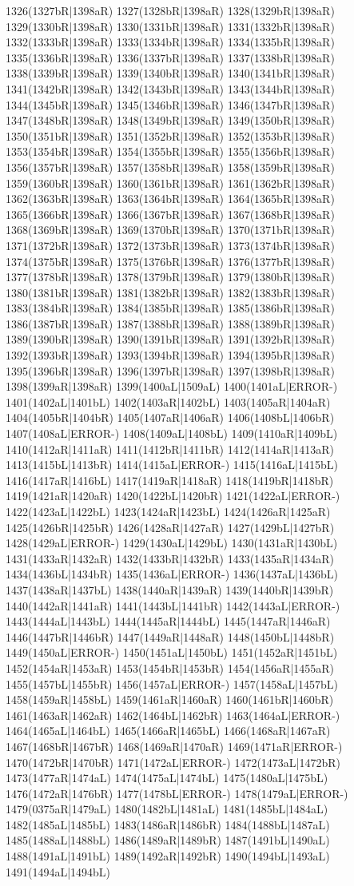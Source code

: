 1326(1327bR|1398aR) 1327(1328bR|1398aR) 1328(1329bR|1398aR) 1329(1330bR|1398aR) 1330(1331bR|1398aR) 1331(1332bR|1398aR) 1332(1333bR|1398aR) 1333(1334bR|1398aR) 1334(1335bR|1398aR) 1335(1336bR|1398aR) 1336(1337bR|1398aR) 1337(1338bR|1398aR) 1338(1339bR|1398aR) 1339(1340bR|1398aR) 1340(1341bR|1398aR) 1341(1342bR|1398aR) 1342(1343bR|1398aR) 1343(1344bR|1398aR) 1344(1345bR|1398aR) 1345(1346bR|1398aR) 1346(1347bR|1398aR) 1347(1348bR|1398aR) 1348(1349bR|1398aR) 1349(1350bR|1398aR) 1350(1351bR|1398aR) 1351(1352bR|1398aR) 1352(1353bR|1398aR) 1353(1354bR|1398aR) 1354(1355bR|1398aR) 1355(1356bR|1398aR) 1356(1357bR|1398aR) 1357(1358bR|1398aR) 1358(1359bR|1398aR) 1359(1360bR|1398aR) 1360(1361bR|1398aR) 1361(1362bR|1398aR) 1362(1363bR|1398aR) 1363(1364bR|1398aR) 1364(1365bR|1398aR) 1365(1366bR|1398aR) 1366(1367bR|1398aR) 1367(1368bR|1398aR) 1368(1369bR|1398aR) 1369(1370bR|1398aR) 1370(1371bR|1398aR) 1371(1372bR|1398aR) 1372(1373bR|1398aR) 1373(1374bR|1398aR) 1374(1375bR|1398aR) 1375(1376bR|1398aR) 1376(1377bR|1398aR) 1377(1378bR|1398aR) 1378(1379bR|1398aR) 1379(1380bR|1398aR) 1380(1381bR|1398aR) 1381(1382bR|1398aR) 1382(1383bR|1398aR) 1383(1384bR|1398aR) 1384(1385bR|1398aR) 1385(1386bR|1398aR) 1386(1387bR|1398aR) 1387(1388bR|1398aR) 1388(1389bR|1398aR) 1389(1390bR|1398aR) 1390(1391bR|1398aR) 1391(1392bR|1398aR) 1392(1393bR|1398aR) 1393(1394bR|1398aR) 1394(1395bR|1398aR) 1395(1396bR|1398aR) 1396(1397bR|1398aR) 1397(1398bR|1398aR) 1398(1399aR|1398aR) 1399(1400aL|1509aL) 1400(1401aL|ERROR-) 1401(1402aL|1401bL) 1402(1403aR|1402bL) 1403(1405aR|1404aR) 1404(1405bR|1404bR) 1405(1407aR|1406aR) 1406(1408bL|1406bR) 1407(1408aL|ERROR-) 1408(1409aL|1408bL) 1409(1410aR|1409bL) 1410(1412aR|1411aR) 1411(1412bR|1411bR) 1412(1414aR|1413aR) 1413(1415bL|1413bR) 1414(1415aL|ERROR-) 1415(1416aL|1415bL) 1416(1417aR|1416bL) 1417(1419aR|1418aR) 1418(1419bR|1418bR) 1419(1421aR|1420aR) 1420(1422bL|1420bR) 1421(1422aL|ERROR-) 1422(1423aL|1422bL) 1423(1424aR|1423bL) 1424(1426aR|1425aR) 1425(1426bR|1425bR) 1426(1428aR|1427aR) 1427(1429bL|1427bR) 1428(1429aL|ERROR-) 1429(1430aL|1429bL) 1430(1431aR|1430bL) 1431(1433aR|1432aR) 1432(1433bR|1432bR) 1433(1435aR|1434aR) 1434(1436bL|1434bR) 1435(1436aL|ERROR-) 1436(1437aL|1436bL) 1437(1438aR|1437bL) 1438(1440aR|1439aR) 1439(1440bR|1439bR) 1440(1442aR|1441aR) 1441(1443bL|1441bR) 1442(1443aL|ERROR-) 1443(1444aL|1443bL) 1444(1445aR|1444bL) 1445(1447aR|1446aR) 1446(1447bR|1446bR) 1447(1449aR|1448aR) 1448(1450bL|1448bR) 1449(1450aL|ERROR-) 1450(1451aL|1450bL) 1451(1452aR|1451bL) 1452(1454aR|1453aR) 1453(1454bR|1453bR) 1454(1456aR|1455aR) 1455(1457bL|1455bR) 1456(1457aL|ERROR-) 1457(1458aL|1457bL) 1458(1459aR|1458bL) 1459(1461aR|1460aR) 1460(1461bR|1460bR) 1461(1463aR|1462aR) 1462(1464bL|1462bR) 1463(1464aL|ERROR-) 1464(1465aL|1464bL) 1465(1466aR|1465bL) 1466(1468aR|1467aR) 1467(1468bR|1467bR) 1468(1469aR|1470aR) 1469(1471aR|ERROR-) 1470(1472bR|1470bR) 1471(1472aL|ERROR-) 1472(1473aL|1472bR) 1473(1477aR|1474aL) 1474(1475aL|1474bL) 1475(1480aL|1475bL) 1476(1472aR|1476bR) 1477(1478bL|ERROR-) 1478(1479aL|ERROR-) 1479(0375aR|1479aL) 1480(1482bL|1481aL) 1481(1485bL|1484aL) 1482(1485aL|1485bL) 1483(1486aR|1486bR) 1484(1488bL|1487aL) 1485(1488aL|1488bL) 1486(1489aR|1489bR) 1487(1491bL|1490aL) 1488(1491aL|1491bL) 1489(1492aR|1492bR) 1490(1494bL|1493aL) 1491(1494aL|1494bL) 